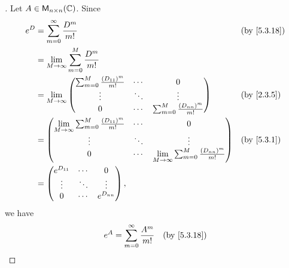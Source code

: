 \begin{proof}[]
  Let \(A \in \ms[n][n][\C]\).
  Since
  \begin{align*}
    e^D & = \sum_{m = 0}^\infty \frac{D^m}{m!}                                                                                                                     &  & \by{5.3.18} \\
        & = \Lim_{M \to \infty} \sum_{m = 0}^M \frac{D^m}{m!}                                                                                                                       \\
        & = \Lim_{M \to \infty} \begin{pmatrix}
                                  \sum_{m = 0}^M \frac{(D_{1 1})^m}{m!} & \cdots & 0                                     \\
                                  \vdots                                & \ddots & \vdots                                \\
                                  0                                     & \cdots & \sum_{m = 0}^M \frac{(D_{n n})^m}{m!}
                                \end{pmatrix}                                         &  & \by{2.3.5}                                       \\
        & = \begin{pmatrix}
              \Lim_{M \to \infty} \sum_{m = 0}^M \frac{(D_{1 1})^m}{m!} & \cdots & 0                                                         \\
              \vdots                                                    & \ddots & \vdots                                                    \\
              0                                                         & \cdots & \Lim_{M \to \infty} \sum_{m = 0}^M \frac{(D_{n n})^m}{m!}
            \end{pmatrix} &  & \by{5.3.1}                   \\
        & = \begin{pmatrix}
              e^{D_{1 1}} & \cdots & 0           \\
              \vdots      & \ddots & \vdots      \\
              0           & \cdots & e^{D_{n n}}
            \end{pmatrix},
  \end{align*}
  we have
  \begin{align*}
    e^A & = \sum_{m = 0}^\infty \frac{A^m}{m!}                                   &  & \by{5.3.18} \\

\end{align*}
\end{proof}
